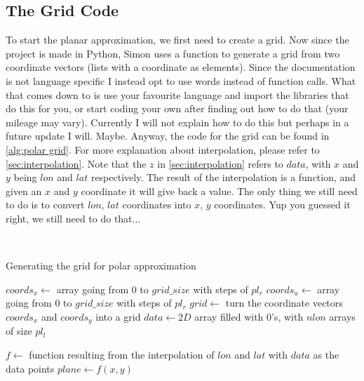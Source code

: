 \subsection{The Grid Code}
To start the planar approximation, we first need to create a grid. Now since the project is made in Python, Simon uses a function to generate a grid from two coordinate vectors (lists with a 
coordinate as elements). Since the documentation is not language specific I instead opt to use words instead of function calls. What that comes down to is use your favourite language and import 
the libraries that do this for you, or start coding your own after finding out how to do that (your mileage may vary). Currently I will not explain how to do this but perhaps in a future update 
I will. Maybe. Anyway, the code for the grid can be found in \autoref{alg:polar grid}. For more explanation about interpolation, please refer to \autoref{sec:interpolation}. Note that the $z$ in 
\autoref{sec:interpolation} refers to $data$, with $x$ and $y$ being $lon$ and $lat$ respectively. The result of the interpolation is a function, and given an $x$ and $y$ coordinate it will give 
back a value. The only thing we still need to do is to convert $lon$, $lat$ coordinates into $x$, $y$ coordinates. Yup you guessed it right, we still need to do that...

\begin{algorithm}\
    \caption{Generating the grid for polar approximation}
    \label{alg:polar grid}
    $coords_x \leftarrow $ array going from $0$ to $grid\_size$ with steps of $pl_r$ \;
    $coords_u \leftarrow $ array going from $0$ to $grid\_size$ with steps of $pl_r$ \;
    $grid \leftarrow $ turn the coordinate vectors $coords_x$ and $coords_y$ into a grid \;
    $data \leftarrow 2D$ array filled with 0's, with $nlon$ arrays of size $pl_l$ \;


    $f \leftarrow$ function resulting from the interpolation of $lon$ and $lat$ with $data$ as the data points \;
    $plane \leftarrow f(x, y)$ \;
\end{algorithm}